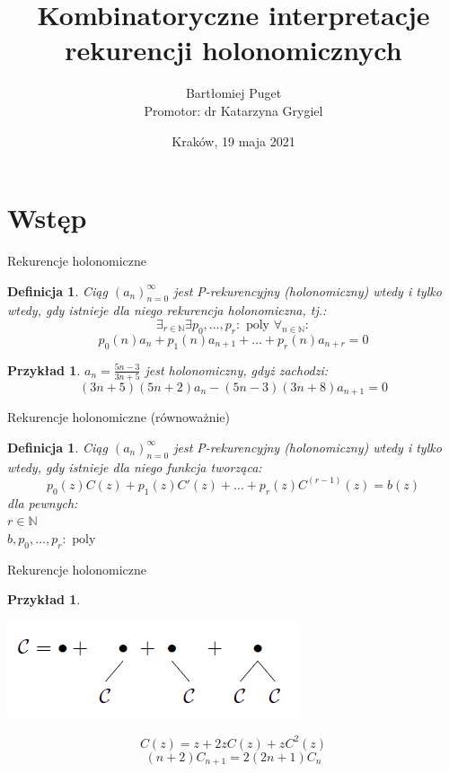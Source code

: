 \documentclass[final]{beamer}
\title{Kombinatoryczne interpretacje rekurencji holonomicznych}
\author[Bartłomiej Puget (TCS UJ)]{Bartłomiej Puget\\Promotor: dr Katarzyna Grygiel}
\institute{Theoretical Computer Science\\Jagiellonian University}
\date{Kraków, 19 maja 2021}
\theoremstyle{bluetheorem}
\theoremstyle{bluetheorem}
\newtheorem{mydefinition}[mytheorem]{Definicja}
\theoremstyle{greentheorem}
\newtheorem{myexample}[mytheorem]{Przykład}
\begin{document}
\maketitle

\section{Wstęp}

\begin{frame}{Rekurencje holonomiczne}
    \begin{mydefinition}
        Ciąg \((a_n)_{n=0}^\infty\) jest P-rekurencyjny (holonomiczny) wtedy i tylko wtedy, gdy istnieje dla niego rekurencja holonomiczna, tj.:
        \[\exists_{r \in \mathbb{N}} \exists {p_0, \ldots, p_r : \text{ poly }}\forall_{n \in \mathbb{N}}:\]
        \[p_0(n) a_n + p_1(n) a_{n + 1} + \ldots + p_r(n) a_{n + r} = 0\]
    \end{mydefinition}

    \begin{myexample}
        \(a_n = \frac{5 n - 3}{3 n + 5}\) jest holonomiczny, gdyż zachodzi:
        \[(3n + 5) (5n + 2) a_n - (5n - 3)(3n + 8) a_{n + 1} = 0\]
    \end{myexample}
\end{frame}

\begin{frame}{Rekurencje holonomiczne (równoważnie)}
    \begin{mydefinition}
        Ciąg \((a_n)_{n=0}^\infty\) jest P-rekurencyjny (holonomiczny) wtedy i tylko wtedy, gdy istnieje dla niego funkcja tworząca:
        \[p_0(z) C(z) + p_1(z) C'(z) + \ldots + p_r(z) C^{(r - 1)}(z) = b(z)\]
        dla pewnych:\\
        \(r \in \mathbb{N}\)\\
        \(b, p_0, \ldots, p_r : \text{ poly }\)
    \end{mydefinition}
\end{frame}

\begin{frame}{Rekurencje holonomiczne}
    \begin{myexample}
        \begin{center}
            \includegraphics[width=.5\textwidth]{catalan_image.png}
        \end{center}
        \[C(z) = z + 2 z C(z) + z C^2(z)\]
        \[(n + 2) C_{n + 1} = 2(2n + 1) C_n \]
    \end{myexample}
\end{frame}
\end{document}
